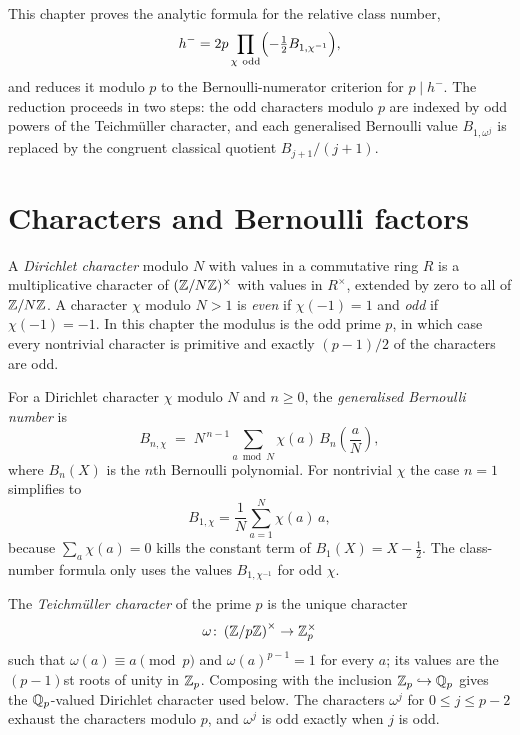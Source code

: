 
This chapter proves the analytic formula for the relative class number,
\[
  h^- = 2p \prod_{\chi\ \mathrm{odd}} \Bigl(-\tfrac12 B_{1,\chi^{-1}}\Bigr),
\]
and reduces it modulo $p$ to the Bernoulli-numerator criterion for
$p \mid h^-$.  The reduction proceeds in two steps: the odd characters
modulo $p$ are indexed by odd powers of the Teichm\"uller character, and
each generalised Bernoulli value $B_{1,\omega^j}$ is replaced by the
congruent classical quotient $B_{j+1}/(j+1)$.

\section{Characters and Bernoulli factors}

\begin{definition}\label{def:dirichlet-character}
  \leanok
A \emph{Dirichlet character} modulo $N$ with values in a commutative ring
$R$ is a multiplicative character of $(\mathbb{Z}/N\mathbb{Z})^\times$ with values in
$R^\times$, extended by zero to all of $\mathbb{Z}/N\mathbb{Z}$.  A character $\chi$
modulo $N > 1$ is \emph{even} if $\chi(-1) = 1$ and \emph{odd} if
$\chi(-1) = -1$.  In this chapter the modulus is the odd prime $p$, in
which case every nontrivial character is primitive and exactly
$(p-1)/2$ of the characters are odd.
\end{definition}

\begin{definition}\label{def:generalized-bernoulli}
  \leanok
For a Dirichlet character $\chi$ modulo $N$ and $n \ge 0$, the
\emph{generalised Bernoulli number} is
\[
  B_{n,\chi}
  \;=\;
  N^{\,n-1} \sum_{a \bmod N} \chi(a)\, B_n\!\left(\frac{a}{N}\right),
\]
where $B_n(X)$ is the $n$th Bernoulli polynomial.  For nontrivial $\chi$
the case $n = 1$ simplifies to
\[
  B_{1,\chi} = \frac{1}{N}\sum_{a=1}^{N} \chi(a)\,a ,
\]
because $\sum_a \chi(a) = 0$ kills the constant term of
$B_1(X) = X - \tfrac12$.  The class-number formula only uses the values
$B_{1,\chi^{-1}}$ for odd $\chi$.
\end{definition}

\begin{definition}\label{def:teichmuller}
  \leanok
The \emph{Teichm\"uller character} of the prime $p$ is the unique character
\[
  \omega\colon\left(\mathbb{Z}/p\mathbb{Z}\right)^\times\to\mathbb{Z}_p^\times
\]
such that $\omega(a) \equiv a \pmod p$ and $\omega(a)^{p-1} = 1$ for every
$a$; its values are the $(p-1)$st roots of unity in $\mathbb{Z}_p$.  Composing with
the inclusion $\mathbb{Z}_p \hookrightarrow \mathbb{Q}_p$ gives the $\mathbb{Q}_p$-valued Dirichlet
character used below.  The characters $\omega^j$ for $0 \le j \le p-2$
exhaust the characters modulo $p$, and $\omega^j$ is odd exactly when $j$
is odd.
\end{definition}

